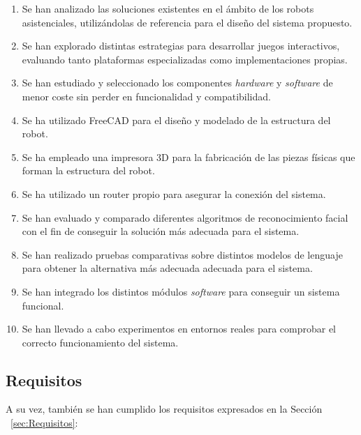 \begin{enumerate}
	\item Se han analizado las soluciones existentes en el ámbito de los robots asistenciales, utilizándolas de referencia para el diseño del sistema propuesto.
	\item Se han explorado distintas estrategias para desarrollar juegos interactivos, evaluando tanto plataformas especializadas como implementaciones propias.
	\item Se han estudiado y seleccionado los componentes \textit{hardware} y \textit{software} de menor coste sin perder en funcionalidad y compatibilidad.
	\item Se ha utilizado FreeCAD para el diseño y modelado de la estructura del robot.
	\item Se ha empleado una impresora 3D para la fabricación de las piezas físicas que forman la estructura del robot.
	\item Se ha utilizado un router propio para asegurar la conexión del sistema.
	\item Se han evaluado y comparado diferentes algoritmos de reconocimiento facial con el fin de conseguir la solución más adecuada para el sistema.
	\item Se han realizado pruebas comparativas  sobre distintos modelos de lenguaje para obtener la alternativa más adecuada adecuada para el sistema.
	\item Se han integrado los distintos módulos \textit{software} para conseguir un sistema funcional.
    \item Se han llevado a cabo experimentos en entornos reales para comprobar el correcto funcionamiento del sistema.
\end{enumerate}


\subsection{Requisitos}

A su vez, también se han cumplido los requisitos expresados en la Sección ~\ref{sec:Requisitos}:

